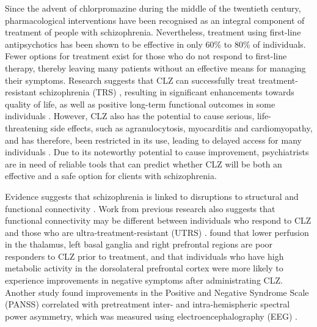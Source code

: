 Since the advent of chlorpromazine during the middle of the twentieth century, pharmacological interventions have been recognised as an integral component of treatment of people with schizophrenia. Nevertheless, treatment using first-line antipsychotics has been shown to be effective in only $60\%$ to $80\%$ of individuals. Fewer options for treatment exist for those who do not respond to first-line therapy, thereby leaving many patients without an effective means for managing their symptoms. Research suggests that CLZ can successfully treat treatment-resistant schizophrenia (TRS) \citep{meltzer2010role, kane1988clozapine}, resulting in significant enhancements towards quality of life, as well as positive long-term functional outcomes in some individuals \citep{essali2009clozapine}. However, CLZ also has the potential to cause serious, life-threatening side effects, such as agranulocytosis, myocarditis and cardiomyopathy, and has therefore, been restricted in its use, leading to delayed access for many individuals \citep{wheeler2008treatment}. Due to its noteworthy potential to cause improvement, psychiatrists are in need of reliable tools that can predict whether CLZ will be both an effective and a safe option for clients with schizophrenia.

Evidence suggests that schizophrenia is linked to disruptions to structural and functional connectivity \citep{yu2012brain, fitzsimmons2013review}. Work from previous research also suggests that functional connectivity may be different between individuals who respond to CLZ and those who are ultra-treatment-resistant (UTRS) \citep{creese1976dopamine, knott2000eeg}. \citep{rodriguez1996spect} found that lower perfusion in the thalamus, left basal ganglia and right prefrontal regions are poor responders to CLZ prior to treatment, and that individuals who have high metabolic activity in the dorsolateral prefrontal cortex were more likely to experience improvements in negative symptoms after administrating CLZ. Another study found improvements in the Positive and Negative Syndrome Scale (PANSS) correlated with pretreatment inter- and intra-hemispheric spectral power asymmetry, which was measured using electroencephalography (EEG) \citep{knott2000eeg}.

